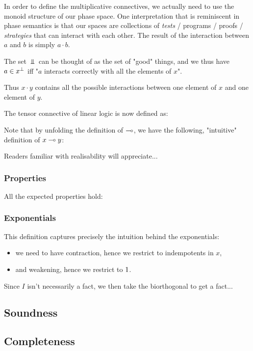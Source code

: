 In order to define the multiplicative connectives, we actually need to
use the monoid structure of our phase space. One interpretation that is
reminiscent in phase semantics is that our spaces are collections of
\emph{tests} / programs / proofs / \emph{strategies} that can interact
with each other. The result of the interaction between \(a\) and \(b\)
is simply \(a\cdot b\).

The set \(\Bot\) can be thought of as the set of "good" things, and we
thus have \(a\in x^\bot\) iff "\(a\) interacts correctly with all the
elements of \(x\)".

Thus \(x\cdot y\) contains all the possible interactions between one
element of \(x\) and one element of \(y\).

The tensor connective of linear logic is now defined as:

Note that by unfolding the definition of \(\multimap\), we have the
following, "intuitive" definition of \(x\multimap y\):

Readers familiar with realisability will appreciate...

\subsubsection{Properties}\label{properties}

All the expected properties hold:

\subsubsection{Exponentials}\label{exponentials-3}

This definition captures precisely the intuition behind the
exponentials:

\begin{itemize}
\tightlist
\item
  we need to have contraction, hence we restrict to indempotents in
  \(x\),
\item
  and weakening, hence we restrict to \(1\).
\end{itemize}

Since \(I\) isn't necessarily a fact, we then take the biorthogonal to
get a fact...

\subsection{Soundness}\label{soundness}

\subsection{Completeness}\label{completeness}

